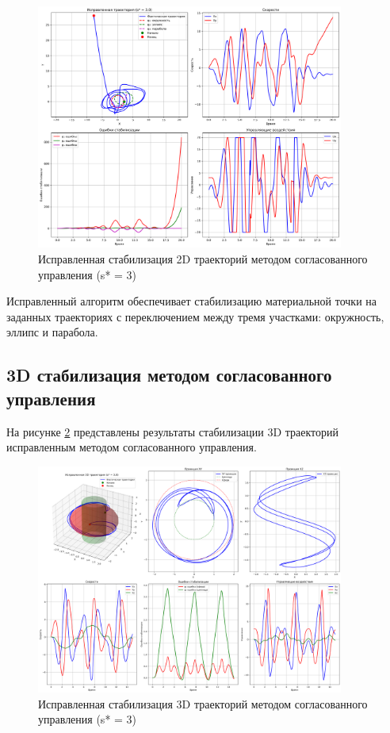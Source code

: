 \begin{figure}[H]
\centering
\includegraphics[width=0.9\textwidth]{images/task1/corrected_2d_s3.0.png}
\caption{Исправленная стабилизация 2D траекторий методом согласованного управления (s* = 3)}
\label{fig:corrected_2d}
\end{figure}

Исправленный алгоритм обеспечивает стабилизацию материальной точки на заданных траекториях с переключением между тремя участками: окружность, эллипс и парабола.

\subsection{3D стабилизация методом согласованного управления}

На рисунке \ref{fig:corrected_3d} представлены результаты стабилизации 3D траекторий исправленным методом согласованного управления.

\begin{figure}[H]
\centering
\includegraphics[width=0.9\textwidth]{images/task2/corrected_3d_s3.0.png}
\caption{Исправленная стабилизация 3D траекторий методом согласованного управления (s* = 3)}
\label{fig:corrected_3d}
\end{figure}

